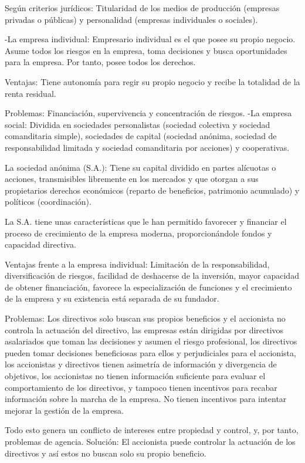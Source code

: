 \documentclass[12pt, twoside, openright]{report} %
\begin{document}
Según criterios jurídicos: Titularidad de los medios de producción (empresas privadas o públicas) y personalidad (empresas individuales o sociales).

-La empresa individual: Empresario individual es el que posee su propio negocio. Asume todos los riesgos en la empresa, toma decisiones y busca oportunidades para la empresa. Por tanto, posee todos los derechos.

Ventajas: Tiene autonomía para regir su propio negocio y recibe la totalidad de la renta residual.

Problemas: Financiación, supervivencia y concentración de riesgos.
\pagebreak
-La empresa social: Dividida en sociedades personalistas (sociedad colectiva y sociedad comanditaria simple), sociedades de capital (sociedad anónima, sociedad de responsabilidad limitada y sociedad comanditaria por acciones) y cooperativas.

La sociedad anónima (S.A.): Tiene su capital dividido en partes alícuotas o acciones, transmisibles libremente en los mercados y que otorgan a sus propietarios derechos económicos (reparto de beneficios, patrimonio acumulado) y políticos (coordinación).

La S.A. tiene unas características que le han permitido favorecer y financiar el proceso de crecimiento de la empresa moderna, proporcionándole fondos y capacidad directiva.

Ventajas frente a la empresa individual: Limitación de la responsabilidad, diversificación de riesgos, facilidad de deshacerse de la inversión, mayor capacidad de obtener financiación, favorece la especialización de funciones y el crecimiento de la empresa y su existencia está separada de su fundador.

Problemas: Los directivos solo buscan sus propios beneficios y el accionista no controla la actuación del directivo, las empresas están dirigidas por directivos asalariados que toman las decisiones y asumen el riesgo profesional, los directivos pueden tomar decisiones beneficiosas para ellos y perjudiciales para el accionista, los accionistas y directivos tienen asimetría de información y divergencia de objetivos, los accionistas no tienen información suficiente para evaluar el comportamiento de los directivos, y tampoco tienen incentivos para recabar información sobre la marcha de la empresa. No tienen incentivos para intentar mejorar la gestión de la empresa.

Todo esto genera un conflicto de intereses entre propiedad y control, y, por tanto, problemas de agencia. Solución: El accionista puede controlar la actuación de los directivos y así estos no buscan solo su propio beneficio.
\end{document}
